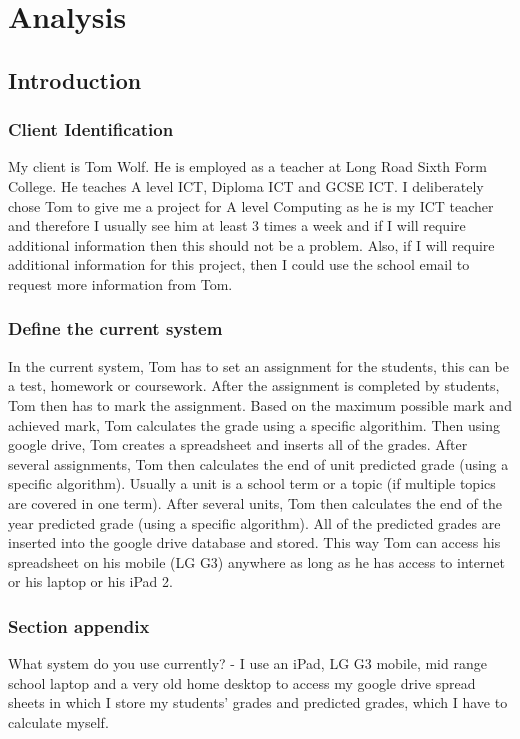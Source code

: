 \chapter{Analysis}

\section{Introduction}

\subsection{Client Identification} 
My client is Tom Wolf. He is employed as a teacher at Long Road Sixth Form College. He teaches A level ICT, Diploma ICT and GCSE ICT. I deliberately chose Tom to give me a project for A level Computing as he is my ICT teacher and therefore I usually see him at least 3 times a week and if I will require additional information then this should not be a problem. Also, if I will require additional information for this project, then I could use the school email to request more information from Tom. 
 
\subsection{Define the current system} 
In the current system, Tom has to set an assignment for the students, this can be a test, homework or coursework. After the assignment is completed by students, Tom then has to mark the assignment. Based on the maximum possible mark and achieved mark, Tom calculates the grade using a specific algorithim. Then using google drive, Tom creates a spreadsheet and inserts all of the grades. After several assignments, Tom then calculates the end of unit predicted grade (using a specific algorithm). Usually a unit is a school term or a topic (if multiple topics are covered in one term). After several units, Tom then calculates the end of the year predicted grade (using a specific algorithm). All of the predicted grades are inserted into the google drive database and stored. This way Tom can access his spreadsheet on his mobile (LG G3) anywhere as long as he has access to internet or his laptop or his iPad 2. 

\subsection{Section appendix}

What system do you use currently?
- I use an iPad, LG G3 mobile, mid range school laptop and a very old home desktop to access my google drive spread sheets in which I store my students' grades and predicted grades, which I have to calculate myself.

